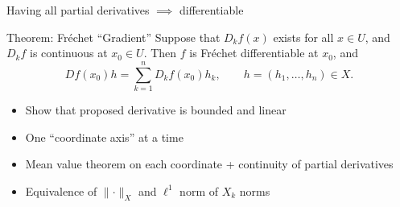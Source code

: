 \documentclass[]{beamer}
\begin{document}
	\begin{frame}{Having all partial derivatives $\implies$ differentiable}
		\begin{block}{Theorem: Fréchet ``Gradient''}
			Suppose that $D_kf(x)$ exists for all $x \in U$, and $D_kf$ is continuous at $x_0 \in U$. Then $f$ is Fréchet differentiable at $x_0$, and
			\begin{equation*}
				Df(x_0)h = \sum_{k=1}^n D_kf(x_0)h_k, \qquad h = (h_1, \dots, h_n) \in X.
			\end{equation*}
		\end{block}
		\vfill
		\begin{itemize}
			\item Show that proposed derivative is bounded and linear
			\item One ``coordinate axis'' at a time
			\item Mean value theorem on each coordinate + continuity of partial derivatives
			\item Equivalence of $\lVert \cdot \rVert_X$ and $\ell^1$ norm of $X_k$ norms
		\end{itemize}
	\end{frame}
\end{document}
